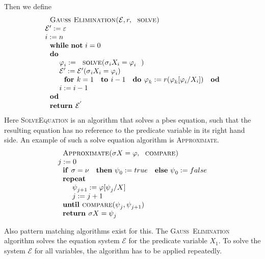 \documentclass{article}
\begin{document}
Then we define%
\begin{equation*}
\begin{array}{l}
\text{\textsc{Gau\textsc{\ss\ }Elimination(}}\mathcal{E},r,\text{\textsc{%
solve)}} \\
\mathcal{E}^{\prime }:=\varepsilon \\
i:=n \\
\text{\textbf{while} \textbf{not} }i=0 \\
\text{\textbf{do}} \\
\qquad \varphi _{i}:=\text{\textsc{solve(}}\sigma _{i}X_{i}=\varphi _{i}%
\text{\textsc{)}} \\
\qquad \mathcal{E}^{\prime }:=\mathcal{E}^{\prime }(\sigma _{i}X_{i}=\varphi
_{i}) \\
\qquad \text{\textbf{for }}k=1\text{ \textbf{to }}i-1\text{ \textbf{do }}%
\varphi _{k}:=r(\varphi _{k}[\varphi _{i}/X_{i}])\text{ \textbf{od}} \\
\qquad i:=i-1 \\
\text{\textbf{od}} \\
\text{\textbf{return }}\mathcal{E}^{^{\prime }}%
\end{array}%
\end{equation*}%
Here \textsc{SolveEquation} is an algorithm that solves a pbes equation,
such that the resulting equation has no reference to the predicate variable
in its right hand side. An example of such a solve equation algorithm is
\textsc{Approximate}.%
\begin{equation*}
\begin{array}{l}
\text{\textsc{Approximate(}}\sigma X=\varphi ,\text{\textsc{compare)}} \\
j:=0 \\
\text{\textbf{if }}\sigma =\nu \text{ \textbf{then} }\psi _{0}:=true\text{
\textbf{else} }\psi _{0}:=false \\
\text{\textbf{repeat}} \\
\qquad \psi _{j+1}:=\varphi \lbrack \psi _{j}/X] \\
\qquad j:=j+1 \\
\text{\textbf{until }\textsc{compare}}(\psi _{j},\psi _{j+1}) \\
\text{\textbf{return }}\sigma X=\psi _{j}%
\end{array}%
\end{equation*}

Also pattern matching algorithms exist for this. The \textsc{Gau\textsc{\ss\
}Elimination} algorithm solves the equation system $\mathcal{E}$ for the
predicate variable $X_{1}$. To solve the system $\mathcal{E}$ for all
variables, the algorithm has to be applied repeatedly.
\end{document}
